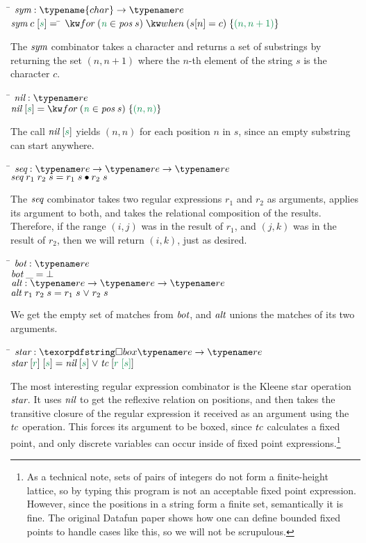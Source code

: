 \begin{tabbing}
\qquad \= $\name{sym} : \typename{char} \to \tre$ \+\\
$\name{sym}\;c\;\ebox{s} =\; $\= $\efor{n}{\name{pos}\;s}{\ewhen{s[n] = c}{\eset{(n, n+1)}}}$
\end{tabbing}
The $\text{\itshape sym}$ combinator takes a character and returns a set of
substrings by returning the set $(n, n+1)$ where the $n$-th element of
the string $s$ is the character $c$.
%
\begin{tabbing}
\qquad \=   $\name{nil} : \tre$ \+\\
  $\name{nil}\;\ebox{s} = \efor{n}{\name{pos}\;s}{\eset{(n,n)}}$
\end{tabbing}
%
The call $\name{nil}\;\ebox{s}$ yields $(n,n)$ for each position
$n$ in $s$, since an empty substring can start anywhere.
%
\begin{tabbing}
\qquad \=   $\name{seq} : \tre \to \tre \to \tre$ \+\\
  $\text{\itshape seq}\;r_1\;r_2\;s = r_1\;s \bullet r_2\;s$
\end{tabbing}
%
The $\text{\itshape seq}$ combinator takes two regular expressions $r_1$ and $r_2$
as arguments, applies its argument to both, and takes the relational
composition of the results. Therefore, if the range $(i,j)$ was in the
result of $r_1$, and $(j,k)$ was in the result of $r_2$, then
we will return $(i,k)$, just as desired.
%
\begin{tabbing}
\qquad \=   $\name{bot} : \tre$ \+\\
  $\text{\itshape bot}\;\_ = \bot$ \\[1em]

  $\name{alt} : \tre \to \tre \to \tre$ \\
  $\name{alt}\;r_1\;r_2\;s = r_1\;s \vee r_2\;s$
\end{tabbing}
%
We get the empty set of matches from $\text{\itshape bot}$, and
$\text{\itshape alt}$ unions the matches of its two arguments.
%
\begin{tabbing}
\qquad \=   $\name{star} : \iso\tre \to \tre$ \+\\
  $\name{star}\;\ebox{r}\;\ebox{s} = \name{nil}\;\ebox{s} \vee \name{tc}\;\ebox{r\;\ebox{s}}$
\end{tabbing}
The most interesting regular expression combinator is the Kleene star
operation $\text{\itshape star}$.  It uses $\text{\itshape nil}$ to get the
reflexive relation on positions, and then takes the transitive closure
of the regular expression it received as an argument using the
$\text{\itshape tc}$ operation. This forces its argument to be boxed, since
$\text{\itshape tc}$ calculates a fixed point, and only discrete variables can
occur inside of fixed point expressions.\footnote{As a technical note,
  sets of pairs of integers do not form a finite-height lattice, so by
  typing this program is not an acceptable fixed point expression.
  However, since the positions in a string form a finite set,
  semantically it is fine. The original Datafun paper shows how one can
  define bounded fixed points to handle cases like this, so we will not be
  scrupulous.}



